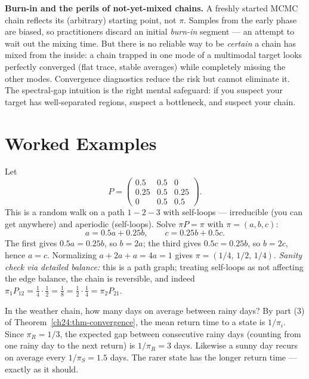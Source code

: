 \begin{trapbox}
\textbf{Burn-in and the perils of not-yet-mixed chains.} A freshly started MCMC
chain reflects its (arbitrary) starting point, not $\pi$. Samples from the early
phase are biased, so practitioners discard an initial \emph{burn-in} segment ---
an attempt to wait out the mixing time. But there is no reliable way to be
\emph{certain} a chain has mixed from the inside: a chain trapped in one mode of a
multimodal target looks perfectly converged (flat trace, stable averages) while
completely missing the other modes. Convergence diagnostics reduce the risk but
cannot eliminate it. The spectral-gap intuition is the right mental safeguard: if
you suspect your target has well-separated regions, suspect a bottleneck, and
suspect your chain.
\end{trapbox}

\section{Worked Examples}
\label{ch24:worked}

\begin{example}
\label{ch24:ex-3x3}
Let
\[
  P = \begin{pmatrix}
    0.5 & 0.5 & 0 \\
    0.25 & 0.5 & 0.25 \\
    0 & 0.5 & 0.5
  \end{pmatrix}.
\]
This is a random walk on a path $1 - 2 - 3$ with self-loops --- irreducible
(you can get anywhere) and aperiodic (self-loops). Solve $\pi P = \pi$ with
$\pi = (a,b,c)$:
\[
  a = 0.5a + 0.25b,\qquad c = 0.25b + 0.5c .
\]
The first gives $0.5a = 0.25b$, so $b = 2a$; the third gives $0.5c = 0.25b$, so
$b = 2c$, hence $a = c$. Normalizing $a + 2a + a = 4a = 1$ gives
$\pi = (1/4,\,1/2,\,1/4)$. \emph{Sanity check via detailed balance:} this is a
path graph; treating self-loops as not affecting the edge balance, the chain is
reversible, and indeed $\pi_1 P_{12} = \tfrac14\cdot\tfrac12 = \tfrac18 =
\tfrac12\cdot\tfrac14 = \pi_2 P_{21}$. \checkmark
\end{example}

\begin{example}
\label{ch24:ex-return-time}
In the weather chain, how many days on average between rainy days? By part (3) of
Theorem~\ref{ch24:thm-convergence}, the mean return time to a state is
$1/\pi_i$. Since $\pi_R = 1/3$, the expected gap between consecutive rainy days
(counting from one rainy day to the next return) is $1/\pi_R = 3$ days. Likewise a
sunny day recurs on average every $1/\pi_S = 1.5$ days. The rarer state has the
longer return time --- exactly as it should.
\end{example}

